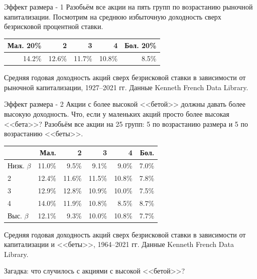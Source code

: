 \documentclass{beamer}
\begin{document}
\begin{frame}{Эффект размера - 1}
\justify
Разобьём все акции на пять групп по возрастанию рыночной капитализации. 
Посмотрим на среднюю избыточную доходность сверх безрисковой процентной ставки.

\justify
\centering
\begin{tabular}{r|r|r|r|r}
Мал. 20\% &      2 &      3 &      4 & Бол. 20\% \\ \hline
   14.2\% & 12.6\% & 11.7\% & 10.8\% &     8.5\%
\end{tabular}

\centering
{\scriptsize Средняя годовая доходность акций сверх безрисковой ставки в
зависимости от рыночной капитализации, 1927--2021 гг. Данные Kenneth French
Data Library.}
\end{frame}



\begin{frame}{Эффект размера - 2}
\justify
Акции с более высокой <<бетой>> должны давать более высокую доходность. Что, 
если у маленьких акций просто более высокая <<бета>>? Разобьём все акции на 25 
групп: 5 по возрастанию размера и 5 по возрастанию <<беты>>.

\justify
\centering
\begin{tabular}{l|r|r|r|r|r}
              &   Мал. &      2 &      3 &     4  & Бол. \\ \hline
Низк. $\beta$ & 11.0\% &  9.5\% &  9.1\% &  9.0\% & 7.0\% \\
2             & 12.4\% & 11.6\% & 11.5\% & 10.8\% & 7.8\% \\
3             & 12.9\% & 12.8\% & 10.9\% & 10.0\% & 7.5\% \\
4             & 14.0\% & 11.9\% & 10.8\% &  8.5\% & 8.7\% \\
Выс. $\beta$  & 12.1\% &  9.3\% & 10.0\% & 10.8\% & 7.7\%
\end{tabular}

\centering
{\scriptsize Средняя годовая доходность акций сверх безрисковой ставки в
зависимости от капитализации и <<беты>>, 1964--2021 гг. Данные Kenneth French 
Data Library.}

\justify
Загадка: что случилось с акциями с высокой <<бетой>>?
\end{frame}
\end{document}
